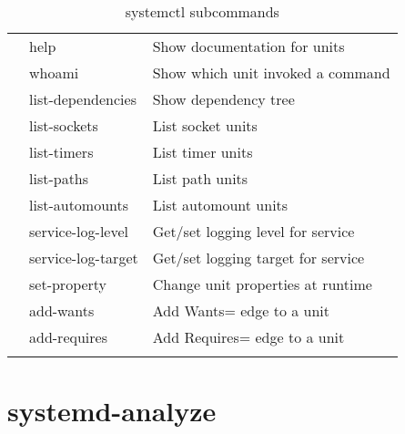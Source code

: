 \documentclass[openany, 12pt]{book}
\begin{document}
\begin{longtable}{lll}
                & help                   & Show documentation for units            \\
                & whoami                 & Show which unit invoked a command       \\
                & list-dependencies      & Show dependency tree                    \\
                & list-sockets           & List socket units                       \\
                & list-timers            & List timer units                        \\
                & list-paths             & List path units                         \\
                & list-automounts        & List automount units                    \\
                & service-log-level      & Get/set logging level for service       \\
                & service-log-target     & Get/set logging target for service      \\
                & set-property           & Change unit properties at runtime       \\
                & add-wants              & Add Wants= edge to a unit               \\
                & add-requires           & Add Requires= edge to a unit            \\
  \caption{systemctl subcommands}
\end{longtable}

\chapter{systemd-analyze}
\end{document}
